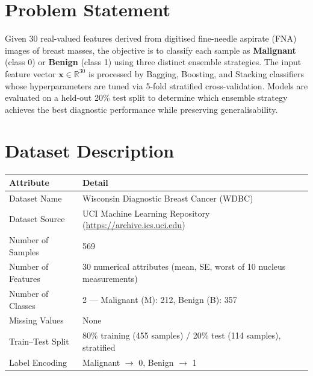 \documentclass[12pt,a4paper]{article}
\begin{document}
\section{Problem Statement}
Given 30 real-valued features derived from digitised fine-needle aspirate (FNA) images of breast
masses, the objective is to classify each sample as \textbf{Malignant} (class 0) or \textbf{Benign}
(class 1) using three distinct ensemble strategies. The input feature vector
$\mathbf{x} \in \mathbb{R}^{30}$ is processed by Bagging, Boosting, and Stacking classifiers whose
hyperparameters are tuned via 5-fold stratified cross-validation. Models are evaluated on a held-out
20\% test split to determine which ensemble strategy achieves the best diagnostic performance while
preserving generalisability.

\section{Dataset Description}

\begin{longtable}{|p{5.5cm}|p{9cm}|}
\hline
\textbf{Attribute}      & \textbf{Detail} \\ \hline
Dataset Name            & Wisconsin Diagnostic Breast Cancer (WDBC) \\ \hline
Dataset Source          & UCI Machine Learning Repository (\url{https://archive.ics.uci.edu}) \\ \hline
Number of Samples       & 569 \\ \hline
Number of Features      & 30 numerical attributes (mean, SE, worst of 10 nucleus measurements) \\ \hline
Number of Classes       & 2 --- Malignant (M): 212, Benign (B): 357 \\ \hline
Missing Values          & None \\ \hline
Train--Test Split       & 80\% training (455 samples) / 20\% test (114 samples), stratified \\ \hline
Label Encoding          & Malignant $\rightarrow$ 0, Benign $\rightarrow$ 1 \\ \hline
\end{longtable}

\end{document}
